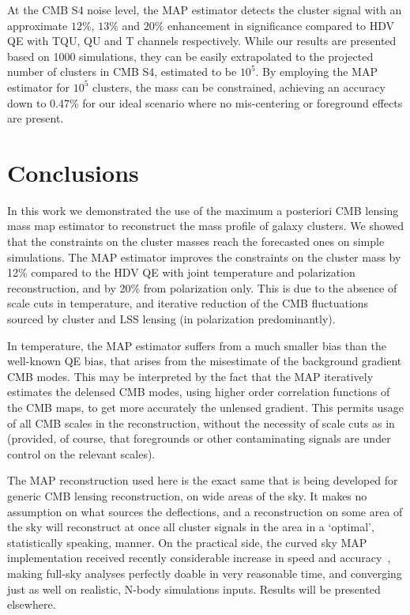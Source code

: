 \documentclass[prd, superscriptaddress, tightenlines, longbibliography, nofootinbib, eqsecnum, amsfonts, amsmath, floatfix, twocolumn, notitlepage]{revtex4-2}
\begin{document}
At the CMB S4 noise level, the MAP estimator detects the cluster signal with an approximate $12\%$, $13\%$ and $20\%$ enhancement in significance compared to HDV QE with TQU, QU and T channels respectively.
While our results are presented based on 1000 simulations, they can be easily extrapolated to the projected number of clusters in CMB S4, estimated to be $10^5$. By employing the MAP estimator for $10^5$ clusters, the mass can be constrained, achieving an accuracy down to 0.47\% for our ideal scenario where no mis-centering or foreground effects are present.

\section{Conclusions}
\label{sec:conclusion}

In this work we demonstrated the use of the maximum a posteriori CMB lensing mass map estimator to reconstruct the mass profile of galaxy clusters.
We showed that the constraints on the cluster masses reach the forecasted ones on simple simulations.
The MAP estimator improves the constraints on the cluster mass by 12\% compared to the HDV QE \cite{Hu:2007bt} with joint temperature and polarization reconstruction, and by 20\% from polarization only. This is due to the absence of scale cuts in temperature, and iterative reduction of the CMB fluctuations sourced by cluster and LSS lensing (in polarization predominantly).


In temperature, the MAP estimator suffers from a much smaller bias than the well-known QE bias, that arises from the misestimate of the background gradient CMB modes. This may be interpreted by the fact that the MAP iteratively estimates the delensed CMB modes, using higher order correlation functions of the CMB maps, to get more accurately the unlensed gradient.
This permits usage of all CMB scales in the reconstruction, without the necessity of scale cuts as in \cite{Hu:2007bt} (provided, of course, that foregrounds or other contaminating signals are under control on the relevant scales).

The MAP reconstruction used here is the exact same that is being developed for generic CMB lensing reconstruction, on wide areas of the sky.  It makes no assumption on what sources the deflections, and a reconstruction on some area of the sky will reconstruct at once all cluster signals in the area in a `optimal',  statistically speaking, manner.
On the practical side, the curved sky MAP implementation received recently considerable increase in speed and accuracy~\cite{Reinecke:2023gtp}, making full-sky analyses perfectly doable in very reasonable time, and converging just as well on realistic, N-body simulations inputs. Results will be presented elsewhere.
\end{document}

